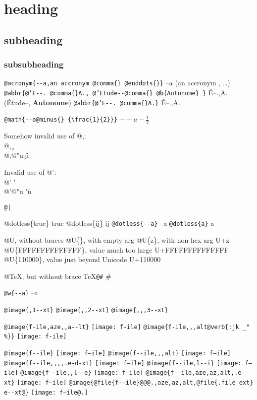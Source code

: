 \documentclass{book}
\newcommand{\GNUTexinfoplaceholder}[1]{}
\newcommand{\GNUTexinfonopagebreakheading}[2]{\let\clearpage\relax \let\cleardoublepage\relax \let\thispagestyle\GNUTexinfoplaceholder #1{#2}}
\renewcommand{\includegraphics}[1]{\fbox{FIG \detokenize{#1}}}
\begin{document}
\GNUTexinfonopagebreakheading{\section*}{heading}

\GNUTexinfonopagebreakheading{\subsection*}{subheading}

\GNUTexinfonopagebreakheading{\subsubsection*}{subsubheading}


\texttt{@acronym\{{-}{-}a,an accronym @comma\{\} @enddots\{\}\}} --a (an accronym , \dots{})
\texttt{@abbr\{@'E{-}{-}. @comma\{\}A., @'Etude{-}{-}@comma\{\} @b\{Autonome\} \}} \'{E}--.\@ ,A.\@ (\'{E}tude--, \textbf{Autonome})
\texttt{@abbr\{@'E{-}{-}. @comma\{\}A.\}} \'{E}--.\@ ,A.\@

\texttt{@math\{{-}{-}a@minus\{\} \{\textbackslash{}frac\{1\}\{2\}\}\}} $--a- {\frac{1}{2}}$




Somehow invalid use of @,:\leavevmode{}\\
@, \c{}
\leavevmode{}\\
@,@"u \c{}\"{u}

Invalid use of @':\leavevmode{}\\
@' \'{}
\leavevmode{}\\
@'@"u \'{}\"{u}

\texttt{@|} 

@dotless\{truc\} truc
@dotless\{ij\} ij
\texttt{@dotless\{{-}{-}a\}} --a
\texttt{@dotless\{a\}} a

@U, without braces @U\{\}, with empty arg 
@U\{z\}, with non-hex arg U+z
@U\{FFFFFFFFFFFFFF\}, value much too large U+FFFFFFFFFFFFFF
@U\{110000\}, value just beyond Unicode U+110000

@TeX, but without brace \TeX{}\texttt{@\#} \#

\texttt{@w\{{-}{-}a\}} \hbox{--a}

\texttt{@image\{,1{-}{-}xt\}} 
\texttt{@image\{,,2{-}{-}xt\}} 
\texttt{@image\{,,,3{-}{-}xt\}} 

\texttt{@image\{f-ile,aze,,a{-}{-}lt\}} \texttt{[image: f-ile]}
\texttt{@image\{f-ile,,,alt@verb\{:jk \_" \%\@\}\}} \texttt{[image: f-ile]}

\texttt{@image\{f{-}{-}ile\}} \texttt{[image: f--ile]}
\texttt{@image\{f{-}{-}ile,,,alt\}} \texttt{[image: f--ile]}
\texttt{@image\{f{-}{-}ile,,,,.e-d-xt\}} \texttt{[image: f--ile]}
\texttt{@image\{f{-}{-}ile,l{-}{-}i\}} \texttt{[image: f--ile]}
\texttt{@image\{f{-}{-}ile,,l{-}{-}e\}} \texttt{[image: f--ile]}
\texttt{@image\{f{-}{-}ile,aze,az,alt,.e{-}{-}xt\}} \texttt{[image: f--ile]}
\texttt{@image\{@file\{f{-}{-}ile\}@@@.,aze,az,alt,@file\{.file ext\} e{-}{-}xt@\}} \texttt{[image: f--ile@.]}
\end{document}
